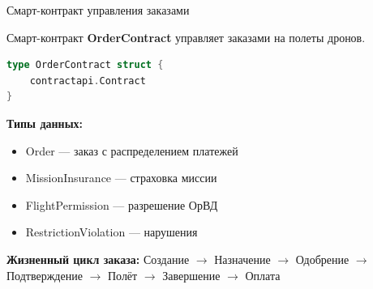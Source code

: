 \documentclass[aspectratio=169]{beamer}
\begin{document}
\begin{frame}[fragile]{Смарт-контракт управления заказами}

Смарт-контракт \textbf{OrderContract} управляет заказами на полеты дронов.

\begin{lstlisting}[language=Go]
type OrderContract struct {
	contractapi.Contract
}
\end{lstlisting}

\textbf{Типы данных:}
\begin{itemize}
\item Order — заказ с распределением платежей
\item MissionInsurance — страховка миссии
\item FlightPermission — разрешение ОрВД
\item RestrictionViolation — нарушения
\end{itemize}

\textbf{Жизненный цикл заказа:}
Создание $\rightarrow$ Назначение $\rightarrow$ Одобрение $\rightarrow$ 
Подтверждение $\rightarrow$ Полёт $\rightarrow$ Завершение $\rightarrow$ Оплата

\end{frame}
\end{document}

